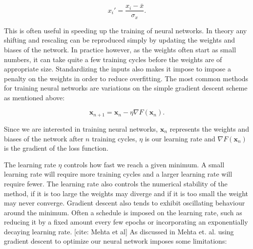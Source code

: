 \begin{equation}
 x_{i}' = \frac{x_{i} - \bar{x}}{\sigma_x} . 
\end{equation}

This is often useful in speeding up the training of neural networks.
In theory any shifting and rescaling can be reproduced simply
by updating the weights and biases of the network.
In practice however, as the weights often start as
small numbers, it can take quite a few training cycles before
the weights are of appropriate size.
Standardizing the inputs also makes it impose to
impose a penalty on the weights in order to reduce
overfitting.
\newline
\newline
The most common methods for training neural networks
are variations on the simple gradient descent scheme as mentioned
above:

\begin{equation}
 \bm{x}_{n+1} = \bm{x}_{n} - \eta \nabla F(\bm{x}_n) . 
\end{equation}

Since we are interested in training neural networks,
$\bm{x}_{n}$ represents the weights and biases of the network
after $n$ training cycles, $\eta$ is our learning rate
and $\nabla F(\bm{x}_n)$ is the gradient of the loss function.
\par
The learning rate $\eta$ controls how fast we reach a given minimum.
A small learning rate will require more training cycles
and a larger learning rate will require fewer.
The learning rate also controls the numerical stability
of the method, if it is too large the weights may diverge
and if it is too small the weight may never converge.
Gradient descent also tends to exhibit oscillating behaviour
around the minimum. Often a schedule is imposed
on the learning rate, such as reducing it by a fixed amount
every few epochs or incorporating an exponentially decaying learning rate.
[cite: Mehta et al]
As discussed in Mehta et. al. using gradient descent to optimize
our neural network imposes some limitations:

